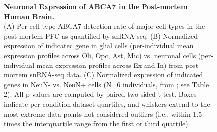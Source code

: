 \begin{figure}[ht]
\begin{subfigure}[t]{1\textwidth}
    \end{subfigure}
    \caption{
        \textbf{Neuronal Expression of ABCA7 in the Post-mortem Human Brain.}\\[1ex]
        (A) Per cell type ABCA7 detection rate of major cell types in the post-mortem PFC as quantified by snRNA-seq. 
        (B) Normalized expression of indicated gene in glial cells (per-individual mean expression profiles across Oli, Opc, Ast, Mic) vs. neuronal cells (per-individual mean expression profiles across Ex and In) from post-mortem snRNA-seq data. 
        (C) Normalized expression of indicated genes in NeuN- vs. NeuN+ cells (N=6 individuals, from \cite{Welch2022-aa}; see Table 2). All p-values are computed by paired two-sided t-test. Boxes indicate per-condition dataset quartiles, and whiskers extend to the most extreme data points not considered outliers (i.e., within 1.5 times the interquartile range from the first or third quartile).
    }
    \label{fig:abca7_expression}
\end{figure}
